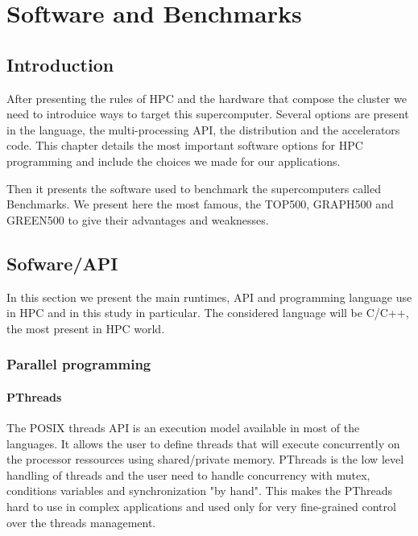 

\chapter{Software and Benchmarks}

\section{Introduction}
After presenting the rules of HPC and the hardware that compose the cluster we need to introduice ways to target this supercomputer. 
Several options are present in the language, the multi-processing API, the distribution and the accelerators code. 
This chapter details the most important software options for HPC programming and include the choices we made for our applications.

Then it presents the software used to benchmark the supercomputers called Benchmarks. 
We present here the most famous, the TOP500, GRAPH500 and GREEN500 to give their advantages and weaknesses. 


\section{Sofware/API}
In this section we present the main runtimes, API and programming language use in HPC and in this study in particular. 
The considered language will be C/C++, the most present in HPC world.

\subsection{Parallel programming}
\subsubsection{PThreads}
The POSIX threads API is an execution model available in most of the languages. 
It allows the user to define threads that will execute concurrently on the processor ressources using shared/private memory.
PThreads is the low level handling of threads and the user need to handle concurrency with mutex, conditions variables and synchronization "by hand".
This makes the PThreads hard to use in complex applications and used only for very fine-grained control over the threads management. 

